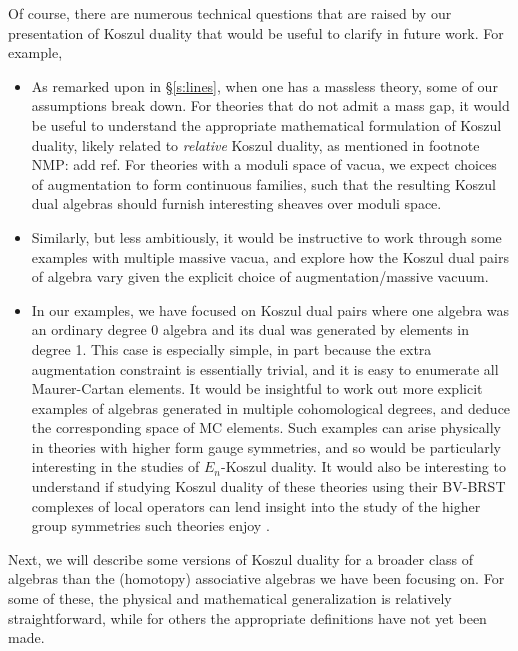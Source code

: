 \documentclass[11pt]{amsart}
\def\natalie#1{{\textcolor{green!65!black}{NMP: {#1}}}}
\begin{document}
Of course, there are numerous technical questions that are raised by our presentation of Koszul duality that would be useful to clarify in future work. For example,
\begin{itemize}
\item As remarked upon in \S \ref{s:lines}, when one has a massless theory, some of our assumptions break down. For theories that do not admit a mass gap, it would be useful to understand the appropriate mathematical formulation of Koszul duality, likely related to \textit{relative} Koszul duality, as mentioned in footnote \natalie{add ref}. For theories with a moduli space of vacua, we expect choices of augmentation to form continuous families, such that the resulting Koszul dual algebras should furnish interesting sheaves over moduli space. 

\item Similarly, but less ambitiously, it would be instructive to work through some examples with multiple massive vacua, and explore how the Koszul dual pairs of algebra vary given the explicit choice of augmentation/massive vacuum. 

\item In our examples, we have focused on Koszul dual pairs where one algebra was an ordinary degree 0 algebra and its dual was generated by elements in degree 1. This case is especially simple, in part because the extra augmentation constraint is essentially trivial, and it is easy to enumerate all Maurer-Cartan elements.  It would be insightful to work out more explicit examples of algebras generated in multiple cohomological degrees, and deduce the corresponding space of MC elements. Such examples can arise physically in theories with higher form gauge symmetries, and so would be particularly interesting in the studies of $E_n$-Koszul duality. It would also be interesting to understand if studying Koszul duality of these theories using their BV-BRST complexes of local operators can lend insight into the study of the higher group symmetries such theories enjoy \cite{2group, 2group6}.
\end{itemize}
 

Next, we will describe some versions of Koszul duality for a broader class of algebras than the (homotopy) associative algebras we have been focusing on. For some of these, the physical and mathematical generalization is relatively straightforward, while for others the appropriate definitions have not yet been made. 
\end{document}
